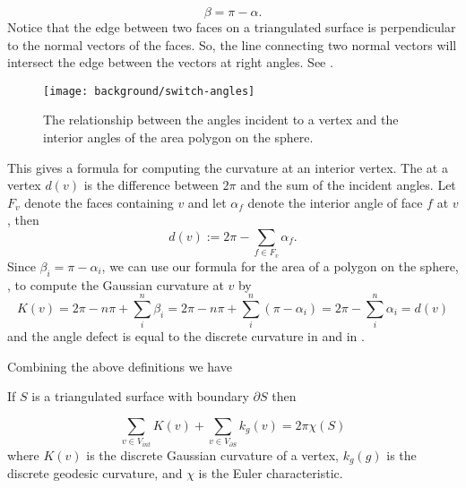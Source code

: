 \begin{equation} \label{eqn:switcheroo}
\beta=\pi-\alpha.
\end{equation}
Notice that the edge between two faces
on a triangulated surface
is perpendicular to the normal vectors of the faces.
So, the line connecting two normal vectors will intersect the edge between the vectors 
at right angles. See .


\begin{figure}[htb]
\centering
\texttt{[image: background/switch-angles]}
\caption{The relationship between the angles incident to a vertex and
the interior angles of the area polygon on the sphere.}
\label{fig:switcheroo}
\end{figure}



This gives a  formula for computing the curvature at an interior vertex.
The  at a vertex $d(v)$ is the difference between $2\pi$ and
the sum of the incident angles.  Let $F_v$ denote the faces containing $v$  
and let $\alpha_f$  denote the interior  angle of face $f$ at $v$, then
\begin{equation} \label{eqn:defect}
d(v):=2\pi -\sum_{f\in F_v}\alpha_f.
\end{equation}
Since $\beta_i=\pi-\alpha_i$,
we can use our formula for the area of a polygon on the sphere,
, to compute the Gaussian curvature at $v$
by
$$K(v)=2\pi -n\pi+\sum_{i}^n \beta_i=2\pi-n\pi +\sum_{i}^n (\pi-\alpha_i) =2\pi-\sum_i^n\alpha_i=d(v)$$
 and the
 angle defect is equal to the discrete curvature in 
 and in .







Combining the above definitions  we have

\begin{theorem} \label{thm:g-b-d}

If $S$ is a triangulated surface with  boundary $\partial S$ then

$$\sum_{v\in V_{int}} K(v) + \sum_{v\in V_{\partial S}} k_g(v) = 2\pi \chi(S)$$
where $K(v)$ is the discrete Gaussian curvature
of a vertex, $k_g(g)$ is the discrete geodesic curvature,  and
$\chi$ is the Euler characteristic.
\end{theorem}





